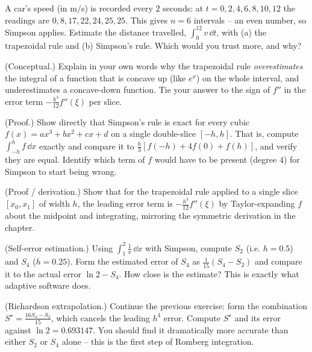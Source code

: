 \begin{exercise}
A car's speed (in m/s) is recorded every $2$ seconds: at $t = 0,2,4,6,8,10,12$ the readings are $0, 8, 17, 22, 24, 25, 25$. This gives $n = 6$ intervals -- an even number, so Simpson applies. Estimate the distance travelled, $\int_0^{12} v\,\dd t$, with (a) the trapezoidal rule and (b) Simpson's rule. Which would you trust more, and why?
\end{exercise}

\begin{exercise}
(Conceptual.) Explain in your own words why the trapezoidal rule \emph{overestimates} the integral of a function that is concave up (like $e^x$) on the whole interval, and underestimates a concave-down function. Tie your answer to the sign of $f''$ in the error term $-\tfrac{h^3}{12}f''(\xi)$ per slice.
\end{exercise}

\begin{exercise}
(Proof.) Show directly that Simpson's rule is exact for every cubic $f(x) = ax^3 + bx^2 + cx + d$ on a single double-slice $[-h, h]$. That is, compute $\int_{-h}^{h} f\,\dd x$ exactly and compare it to $\tfrac{h}{3}[f(-h) + 4f(0) + f(h)]$, and verify they are equal. Identify which term of $f$ would have to be present (degree $4$) for Simpson to start being wrong.
\end{exercise}

\begin{exercise}
(Proof / derivation.) Show that for the trapezoidal rule applied to a single slice $[x_0, x_1]$ of width $h$, the leading error term is $-\tfrac{h^3}{12}f''(\xi)$ by Taylor-expanding $f$ about the midpoint and integrating, mirroring the symmetric derivation in the chapter.
\end{exercise}

\begin{exercise}
(Self-error estimation.) Using $\int_1^2 \tfrac1x\,\dd x$ with Simpson, compute $S_2$ (i.e. $h = 0.5$) and $S_4$ ($h = 0.25$). Form the estimated error of $S_4$ as $\tfrac{1}{15}(S_4 - S_2)$ and compare it to the actual error $\ln 2 - S_4$. How close is the estimate? This is exactly what adaptive software does.
\end{exercise}

\begin{exercise}
(Richardson extrapolation.) Continue the previous exercise: form the combination $S^\star = \tfrac{16 S_4 - S_2}{15}$, which cancels the leading $h^4$ error. Compute $S^\star$ and its error against $\ln 2 = 0.693147$. You should find it dramatically more accurate than either $S_2$ or $S_4$ alone -- this is the first step of Romberg integration.
\end{exercise}

